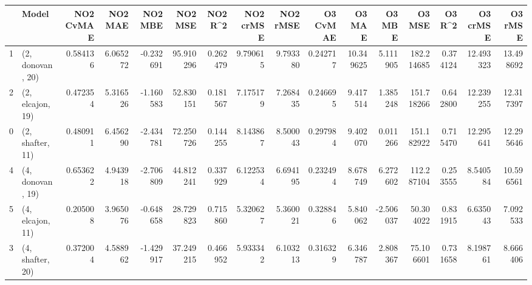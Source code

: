 \begin{tabular}{llrrrrrrrrrrrrrr}
\toprule
{} &             Model &  NO2 CvMAE &   NO2 MAE &   NO2 MBE &    NO2 MSE &   NO2 R\textasciicircum2 &  NO2 crMSE &  NO2 rMSE &  O3 CvMAE &     O3 MAE &    O3 MBE &      O3 MSE &    O3 R\textasciicircum2 &   O3 crMSE &    O3 rMSE \\
\midrule
1 &  (2, donovan, 20) &   0.584136 &  6.065272 & -0.232691 &  95.910296 &  0.262479 &   9.790615 &  9.793380 &  0.242717 &  10.349625 &  5.111905 &  182.214685 &  0.374124 &  12.493323 &  13.498692 \\
2 &  (2, elcajon, 19) &   0.472354 &  5.316526 & -1.160583 &  52.830151 &  0.181567 &   7.175179 &  7.268435 &  0.246695 &   9.417514 &  1.385248 &  151.718266 &  0.642800 &  12.239255 &  12.317397 \\
0 &  (2, shafter, 11) &   0.480911 &  6.456290 & -2.434781 &  72.250726 &  0.144255 &   8.143867 &  8.500043 &  0.297984 &   9.402070 &  0.011266 &  151.182922 &  0.715470 &  12.295641 &  12.295646 \\
4 &  (4, donovan, 19) &   0.653622 &  4.943918 & -2.706809 &  44.812241 &  0.337929 &   6.122534 &  6.694195 &  0.232494 &   8.678749 &  6.272602 &  112.287104 &  0.253555 &   8.540584 &  10.596561 \\
5 &  (4, elcajon, 11) &   0.205008 &  3.965076 & -0.648658 &  28.729823 &  0.715860 &   5.320627 &  5.360021 &  0.328846 &   5.840062 & -2.506037 &   50.304022 &  0.831915 &   6.635043 &   7.092533 \\
3 &  (4, shafter, 20) &   0.372004 &  4.588962 & -1.429917 &  37.249215 &  0.466952 &   5.933342 &  6.103213 &  0.316329 &   6.346787 &  2.808367 &   75.106601 &  0.731658 &   8.198761 &   8.666406 \\
\bottomrule
\end{tabular}

